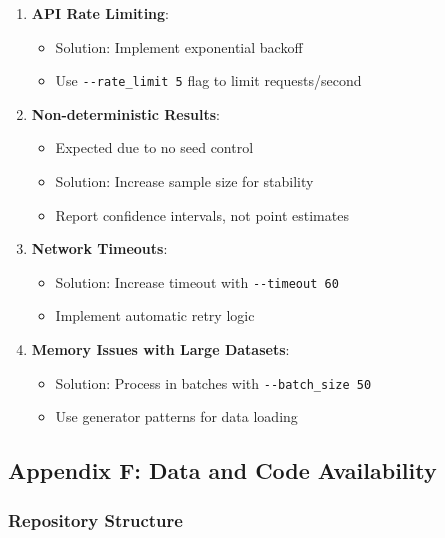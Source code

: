 \documentclass[
  11pt]{article}
\providecommand{\tightlist}{%
  \setlength{\itemsep}{0pt}\setlength{\parskip}{0pt}}
\begin{document}
\begin{enumerate}
\def\labelenumi{\arabic{enumi}.}
\tightlist
\item
  \textbf{API Rate Limiting}:

  \begin{itemize}
  \tightlist
  \item
    Solution: Implement exponential backoff
  \item
    Use \texttt{-\/-rate\_limit\ 5} flag to limit requests/second
  \end{itemize}
\item
  \textbf{Non-deterministic Results}:

  \begin{itemize}
  \tightlist
  \item
    Expected due to no seed control
  \item
    Solution: Increase sample size for stability
  \item
    Report confidence intervals, not point estimates
  \end{itemize}
\item
  \textbf{Network Timeouts}:

  \begin{itemize}
  \tightlist
  \item
    Solution: Increase timeout with \texttt{-\/-timeout\ 60}
  \item
    Implement automatic retry logic
  \end{itemize}
\item
  \textbf{Memory Issues with Large Datasets}:

  \begin{itemize}
  \tightlist
  \item
    Solution: Process in batches with \texttt{-\/-batch\_size\ 50}
  \item
    Use generator patterns for data loading
  \end{itemize}
\end{enumerate}

\subsection{Appendix F: Data and Code
Availability}\label{appendix-f-data-and-code-availability}

\subsubsection{Repository Structure}\label{repository-structure}
\end{document}
